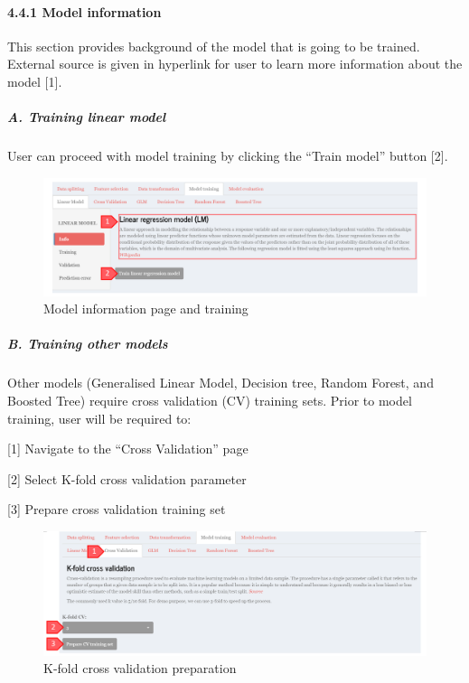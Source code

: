 \documentclass[
  12pt,
]{article}
\begin{document}
\hypertarget{model-information}{%
\paragraph{4.4.1 Model information}\label{model-information}}

This section provides background of the model that is going to be
trained. External source is given in hyperlink for user to learn more
information about the model {[}1{]}.

\hypertarget{a.-training-linear-model}{%
\subparagraph{A. Training linear model}\label{a.-training-linear-model}}

User can proceed with model training by clicking the ``Train model''
button {[}2{]}.

\begin{figure}[H]

{\centering \includegraphics[width=0.95\linewidth]{images/mdltrain1} 

}

\caption{Model information page and training}\label{fig:unnamed-chunk-17}
\end{figure}

\hypertarget{b.-training-other-models}{%
\subparagraph{B. Training other models}\label{b.-training-other-models}}

Other models (Generalised Linear Model, Decision tree, Random Forest,
and Boosted Tree) require cross validation (CV) training sets. Prior to
model training, user will be required to:

{[}1{]} Navigate to the ``Cross Validation'' page

{[}2{]} Select K-fold cross validation parameter

{[}3{]} Prepare cross validation training set

\begin{figure}[H]

{\centering \includegraphics[width=0.95\linewidth]{images/kfold} 

}

\caption{K-fold cross validation preparation}\label{fig:unnamed-chunk-18}
\end{figure}
\end{document}
